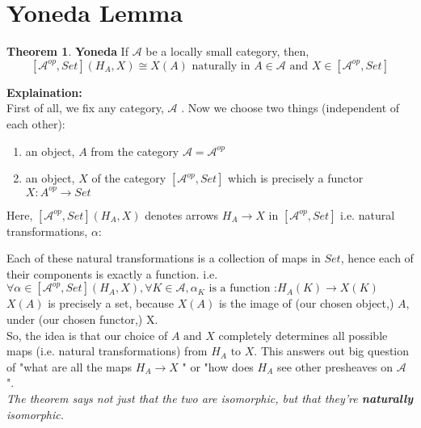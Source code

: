 \documentclass[18pt,a4paper]{extarticle}
\theoremstyle{definition}
\newtheorem{theorem}{Theorem}[section]
\theoremstyle{definition}
\begin{document}
\section{Yoneda Lemma} %


\begin{theorem}{\textbf{Yoneda}} %
	If $\mathcal{A} $ be a locally small category, then, \\
	\[ [ \mathcal{A} ^{op},Set ](H_A,X) \cong X(A) \text{ naturally in } A \in \mathcal{A} \text{ and }
	X \in [ \mathcal{A}^{op},Set]\]
\end{theorem}
\textbf{Explaination:} \\
First of all, we fix any category, $\mathcal{A} $ . Now we choose two things (independent of each other):
\begin{enumerate}[label=\roman*]
	\item an object, $A$ from the category $ \mathcal{A}= \mathcal{A} ^{op} $
	\item an object, $X$ of the category $[ \mathcal{A}^{op},Set] $
		which is precisely a functor $X: A^{op} \rightarrow Set$
\end{enumerate}
Here, $[ \mathcal{A}^{op},Set](	H_A,X) $ denotes arrows $H_A \rightarrow X$ in $[ \mathcal{A}^{op},Set] $
i.e. natural transformations, $\alpha :$
Each of these natural transformations is a collection of maps in $Set$, hence each of their
components is exactly a function. i.e.
$\forall \alpha \in [ \mathcal{A}^{op},Set](H_A,X), \forall K \in \mathcal{A}, \alpha_K \text{ is a function :} H_A(K) \to X(K)$\\

$X(A)$ is precisely a set, because $X(A)$ is the image of (our chosen object,) $A$, under (our chosen functor,) X. \\

So, the idea is that our choice of $A \text{ and } X$ completely determines all possible maps
(i.e. natural transformations) from $H_A \text{ to } X$. This answers out big question of "what are all the maps
$H_A  \rightarrow X$ " or "how does $H_A$ see other presheaves on $\mathcal{A} $ ".\\

\textit{The theorem says not just that the two are isomorphic, but that they're \textbf{naturally} isomorphic.}
\end{document}

